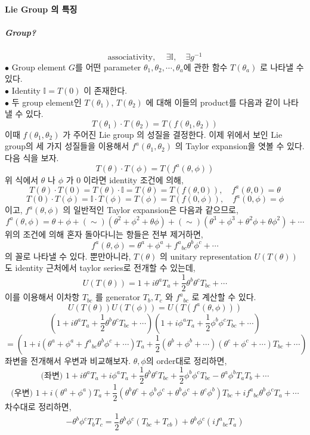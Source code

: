 \documentclass[a4paper,12pt]{report}
\begin{document}
	\paragraph{Lie Group 의 특징}
	\subparagraph{Group?}
	$$\mbox{associativity, }\quad\exists \mathbb{I},\quad\exists g^{-1} $$
	$\bullet$ Group element $G$를 어떤 parameter $\theta_1,\theta_2,\cdots,\theta_a$에 관한 함수 $T(\theta_a)$ 로 나타낼 수 있다.\\
	$\bullet$ Identity $\mathbb{I}=T(0)$ 이 존재한다.\\
	$\bullet$ 두 group element인 $T(\theta_1),\,T(\theta_2)$ 에 대해 이들의 product를 다음과 같이 나타낼 수 있다.
	$$T(\theta_1)\cdot T(\theta_2)=T(f(\theta_1,\theta_2))$$ 
	이때 $f(\theta_1,\theta_2)$ 가 주어진 Lie group 의 성질을 결정한다. 이제 위에서 보인 Lie group의 세 가지 성질들을 이용해서 $f^a(\theta_1,\theta_2)$ 의 Taylor expansion을 엿볼 수 있다. 다음 식을 보자.
	$$T(\theta)\cdot T(\phi)=T(f^a(\theta,\phi))$$
	위 식에서 $\theta$ 나 $\phi$ 가 0 이라면 identity 조건에 의해,
	$$T(\theta)\cdot T(0)=T(\theta)\cdot \mathbb{I}=T(\theta)=T(f(\theta,0)),\quad f^a(\theta,0)=\theta$$
	$$T(0)\cdot T(\phi)=\mathbb{I} \cdot T(\phi)=T(\phi)=T(f(0,\phi)),\quad f^a(0,\phi)=\phi$$  
	이고, $f^a(\theta,\phi)$ 의 일반적인 Taylor expansion은 다음과 같으므로,
	$$f^a(\theta,\phi)=\theta+\phi+(\sim)(\theta^2+\phi^2+\theta\phi)+(\sim)(\theta^3+\phi^3+\theta^2\phi+\theta\phi^2)+\cdots$$
	위의 조건에 의해 혼자 돌아다니는 항들은 전부 제거하면,
	$$f^a(\theta,\phi)=\theta^a+\phi^a+{{f^a}_{bc}}\theta^b\phi^c+\cdots$$	
	의 꼴로 나타낼 수 있다. 뿐만아니라, $T(\theta)$ 의 unitary representation $U(T(\theta))$ 도 identity 근처에서 taylor series로 전개할 수 있는데,
	$$U(T(\theta))=1+i\theta^a T_{a}+\frac{1}{2}\theta^b\theta^cT_{bc}+\cdots$$
	이를 이용해서 이차항 $T_{bc}$ 를 generator $T_b, T_c$ 와 ${f^a}_{bc}$ 로 계산할 수 있다.
	$$U(T(\theta))U(T(\phi))=U(T(f^a(\theta,\phi)))$$  
	$$(1+i\theta^aT_a+\frac{1}{2}\theta^b\theta^cT_{bc}+\cdots)(1+i\phi^aT_a+\frac{1}{2}\phi^b\phi^cT_{bc}+\cdots)$$
	$$=(1+i(\theta^a+\phi^a+{f^a}_{bc}\theta^b\phi^c+\cdots)T_a+\frac{1}{2}(\theta^b+\phi^b+\cdots)(\theta^c+\phi^c+\cdots)T_{bc}+\cdots)$$
	좌변을 전개해서 우변과 비교해보자. $\theta,\phi$의 order대로 정리하면,
	$$\mbox{(좌변) }1+i\theta^a T_a+i\phi^a T_a+\frac{1}{2}\theta^b\theta^cT_{bc}+\frac{1}{2}\phi^b\phi^cT_{bc}-\theta^a\phi^bT_aT_b+\cdots$$
	$$\mbox{(우변) }1+i(\theta^a+\phi^a)T_a+\frac{1}{2}(\theta^b\theta^c+\phi^b\phi^c+\theta^b\phi^c+\theta^c\phi^b)T_{bc}+i{f^a}_{bc}\theta^b\phi^cT_{a}+\cdots$$
	차수대로 정리하면,
	$$-\theta^b\phi^cT_bT_c=\frac{1}{2}\theta^b\phi^c(T_{bc}+T_{cb})+\theta^b\phi^c(i{f^a}_{bc}T_a)$$
\end{document}
